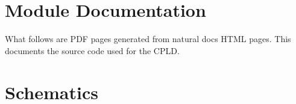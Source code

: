 \documentclass[usletter]{article}
\begin{document}
  

  \section{Module Documentation}
  \par What follows are PDF pages generated from natural docs HTML pages. This documents
  the source code used for the CPLD.

  

  \section{Schematics}

  
\end{document}
